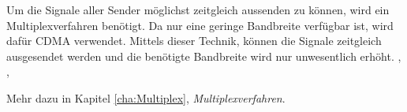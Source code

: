 Um die Signale aller Sender möglichst zeitgleich aussenden zu können, wird ein Multiplexverfahren benötigt. Da nur eine geringe Bandbreite verfügbar ist, wird dafür CDMA verwendet. Mittels dieser Technik, können die Signale zeitgleich ausgesendet werden und die benötigte Bandbreite wird nur unwesentlich erhöht. \cite{PositionA}, \cite{PositionB}, \cite{BPSK}

Mehr dazu in Kapitel \ref{cha:Multiplex}, \emph{Multiplexverfahren}.



